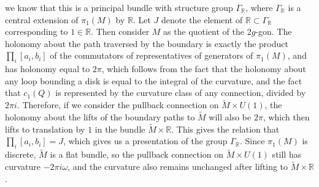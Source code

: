 \documentclass[psamsfonts, 12pt]{amsart}
\theoremstyle{definition}
\theoremstyle{remark}
\newcommand{\R}{\mathbb{R}}
\begin{document}
we know that this is a principal bundle with structure group $\Gamma_\R$, where
$\Gamma_\R$ is a central extension of $\pi_1(M)$ by $\R$. Let $J$ denote the
element of $\R \subset \Gamma_\R$ corresponding to $1 \in \R$. Then consider
$M$ as the quotient of the $2g$-gon. The holonomy about the path traversed by
the boundary is exactly the product $\prod_i [a_i,b_i]$ of the commutators of
representatives of generators of $\pi_1(M)$, and has holonomy equal to $2\pi$, which
follows from the fact that the holonomy about any loop bounding a disk is equal to the
integral of the curvature, and the fact that $c_1(Q)$ is represented by
the curvature class of any connection, divided by $2\pi i$. Therefore, if we
consider the pullback connection on $\widetilde{M} \times U(1)$, the holonomy
about the lifts of the boundary paths to $\widetilde{M}$ will also be $2\pi$,
which then lifts to translation by $1$ in the bundle $\widetilde{M} \times \R$.
This gives the relation that $\prod_i [a_i,b_i] = J$, which gives us a presentation
of the group $\Gamma_\R$. Since $\pi_1(M)$ is discrete, $\widetilde{M}$ is a flat
bundle, so the pullback connection on $\widetilde{M} \times U(1)$ still has curvature
$-2\pi i \omega$, and the curvature also remains unchanged after lifting to
$\widetilde{M} \times \R$. \\
\end{document}

